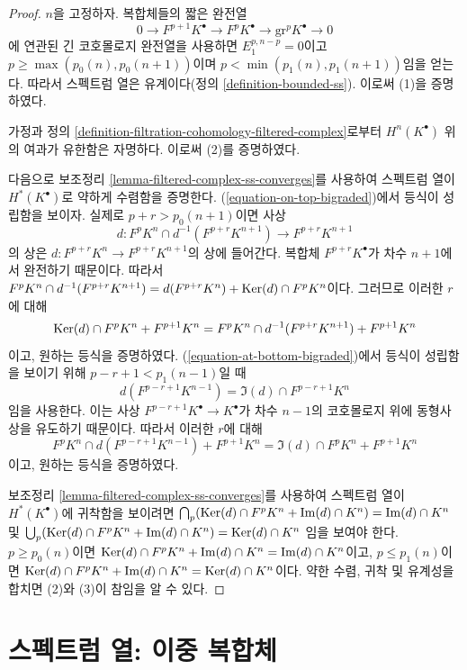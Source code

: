 \begin{proof}
$n$을 고정하자. 복합체들의 짧은 완전열
$$
0 \to F^{p + 1}K^\bullet \to F^pK^\bullet \to \text{gr}^pK^\bullet \to 0
$$
에 연관된 긴 코호몰로지 완전열을 사용하면
$E_1^{p, n - p} = 0$이고
$p \geq \max(p_0(n), p_0(n + 1))$이며
$p < \min(p_1(n), p_1(n + 1))$임을 얻는다.
따라서 스펙트럼 열은 유계이다(정의 \ref{definition-bounded-ss}).
이로써 (1)을 증명하였다.

\medskip\noindent
가정과 정의 \ref{definition-filtration-cohomology-filtered-complex}로부터
$H^n(K^\bullet)$ 위의 여과가 유한함은 자명하다. 이로써 (2)를 증명하였다.

\medskip\noindent
다음으로 보조정리 \ref{lemma-filtered-complex-ss-converges}를 사용하여
스펙트럼 열이 $H^*(K^\bullet)$로 약하게 수렴함을 증명한다.
(\ref{equation-on-top-bigraded})에서 등식이 성립함을 보이자. 실제로
$p + r > p_0(n + 1)$이면 사상
$$
d : F^pK^{n} \cap d^{-1}(F^{p + r}K^{n + 1}) \to F^{p + r}K^{n + 1}
$$
의 상은 $d : F^{p + r}K^n \to F^{p + r}K^{n + 1}$의 상에 들어간다.
복합체 $F^{p + r}K^\bullet$가 차수 $n + 1$에서 완전하기 때문이다.
따라서 $F^pK^{n} \cap d^{-1}(F^{p + r}K^{n + 1}) =
d(F^{p + r}K^n) + \mathop{\mathrm{Ker}}(d) \cap F^pK^n$이다. 그러므로 이러한 $r$에 대해
$$
\mathop{\mathrm{Ker}}(d) \cap F^pK^{n} + F^{p + 1}K^{n} =
F^pK^{n} \cap d^{-1}(F^{p + r}K^{n + 1}) + F^{p + 1}K^{n}
$$
이고, 원하는 등식을 증명하였다. (\ref{equation-at-bottom-bigraded})에서
등식이 성립함을 보이기 위해 $p - r + 1 < p_1(n - 1)$일 때
$$
d(F^{p - r + 1}K^{n - 1}) = \Im(d) \cap F^{p - r + 1}K^n
$$
임을 사용한다. 이는 사상 $F^{p - r + 1}K^\bullet \to K^\bullet$가 차수
$n - 1$의 코호몰로지 위에 동형사상을 유도하기 때문이다. 따라서 이러한
$r$에 대해
$$
F^pK^{n} \cap d(F^{p - r + 1}K^{n - 1}) + F^{p + 1}K^{n} =
\Im(d) \cap F^pK^{n} + F^{p + 1}K^{n}
$$
이고, 원하는 등식을 증명하였다.

\medskip\noindent
보조정리 \ref{lemma-filtered-complex-ss-converges}를 사용하여 스펙트럼
열이 $H^*(K^\bullet)$에 귀착함을 보이려면
$\bigcap_p (\mathop{\mathrm{Ker}}(d) \cap F^pK^n + \mathop{\mathrm{Im}}(d) \cap K^n) = \mathop{\mathrm{Im}}(d) \cap K^n$
및
$\bigcup_p (\mathop{\mathrm{Ker}}(d) \cap F^pK^n + \mathop{\mathrm{Im}}(d) \cap K^n) = \mathop{\mathrm{Ker}}(d) \cap K^n$
임을 보여야 한다. $p \geq p_0(n)$이면
$\mathop{\mathrm{Ker}}(d) \cap F^pK^n + \mathop{\mathrm{Im}}(d) \cap K^n = \mathop{\mathrm{Im}}(d) \cap K^n$이고,
$p \leq p_1(n)$이면
$\mathop{\mathrm{Ker}}(d) \cap F^pK^n + \mathop{\mathrm{Im}}(d) \cap K^n = \mathop{\mathrm{Ker}}(d) \cap K^n$이다.
약한 수렴, 귀착 및 유계성을 합치면 (2)와 (3)이 참임을 알 수 있다.
\end{proof}

\section{스펙트럼 열: 이중 복합체}
\label{section-double-complex}

